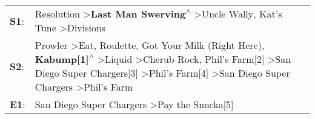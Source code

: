 \begin{supertabular}{p{0.03\textwidth}p{0.92\textwidth}}
 \textbf{S1}:  &                                                                                                                                                                                                                                                                                                                                                                    Resolution\textsuperscript{} \textgreater \enspace \textbf{Last Man Swerving\textsuperscript{$\wedge$}} \textgreater \enspace Uncle Wally\textsuperscript{}, \enspace Kat's Tune\textsuperscript{} \textgreater \enspace Divisions\textsuperscript{}  \enspace  \\
 \textbf{S2}:  &  Prowler\textsuperscript{} \textgreater \enspace Eat\textsuperscript{}, \enspace Roulette\textsuperscript{}, \enspace Got Your Milk (Right Here)\textsuperscript{}, \enspace \textbf{Kabump[1]\textsuperscript{$\wedge$}} \textgreater \enspace Liquid\textsuperscript{} \textgreater \enspace Cherub Rock\textsuperscript{}, \enspace Phil's Farm[2]\textsuperscript{} \textgreater \enspace San Diego Super Chargers[3]\textsuperscript{} \textgreater \enspace Phil's Farm[4]\textsuperscript{} \textgreater \enspace San Diego Super Chargers\textsuperscript{} \textgreater \enspace Phil's Farm\textsuperscript{}  \enspace  \\
 \textbf{E1}:  &                                                                                                                                                                                                                                                                                                                                                                                                                                                                                                                    San Diego Super Chargers\textsuperscript{} \textgreater \enspace Pay the Snucka[5]\textsuperscript{}  \enspace  \\
\end{supertabular}
